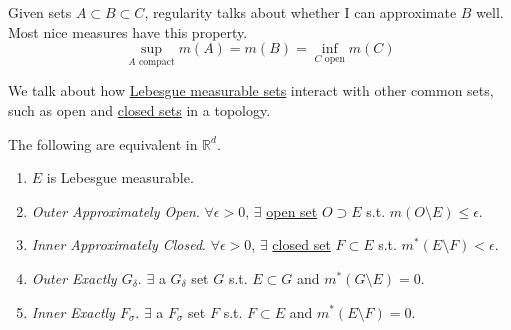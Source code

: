   Given sets $A \subset B \subset C$, regularity talks about whether I can approximate $B$ well. Most nice measures have this property. 
  \begin{equation}
    \sup_{A \text{ compact}} m(A) = m(B) = \inf_{C \text{ open}} m(C)
  \end{equation}

  We talk about how \hyperref[def:lebesgue-measurable-set]{Lebesgue measurable sets} interact with other common sets, such as open and \hyperref[pst-def:closed]{closed sets} in a topology. 

  \begin{theorem}
    \label{thm:regularity-definitions-of-lebesgue-measurable}
    The following are equivalent in $\mathbb{R}^d$. 
    \begin{enumerate}
      \item $E$ is Lebesgue measurable. 

      \item \textit{Outer Approximately Open}. $\forall \epsilon > 0$, $\exists$ \hyperref[pst-def:open-set]{open set} $O \supset E$  s.t. $m(O \setminus E) \leq \epsilon$. 

      \item \textit{Inner Approximately Closed}. $\forall \epsilon > 0$, $\exists$ \hyperref[pst-def:closed]{closed set} $F \subset E$ s.t. $m^\ast (E \setminus F) < \epsilon$.  

      \item \textit{Outer Exactly $G_\delta$}. $\exists$ a $G_\delta$ set $G$ s.t. $E \subset G$ and $m^\ast (G \setminus E) = 0$. 

      \item \textit{Inner Exactly $F_\sigma$}. $\exists$ a $F_\sigma$ set $F$ s.t. $F \subset E$ and $m^\ast (E \setminus F) = 0$. 
    \end{enumerate}
  \end{theorem}
